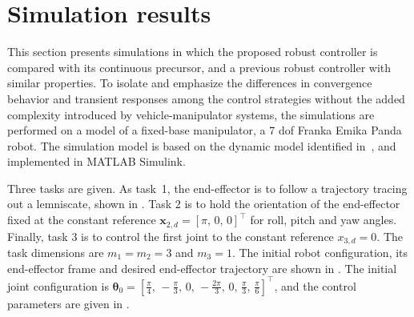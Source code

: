 \documentclass[../main.tex]{subfiles}
\begin{document}






\section{Simulation results}\label{sec:comp:simulation}
This section presents simulations in which the proposed robust controller is compared with its continuous precursor, and a previous robust controller with similar properties.
To isolate and emphasize the differences in convergence behavior and transient responses among the control strategies without the added complexity introduced by vehicle-manipulator systems, the simulations are performed on a model of a fixed-base manipulator, a 7 \gls{dof} Franka Emika Panda robot. The simulation model is based on the dynamic model identified in~\cite{Gaz2019}, and implemented in MATLAB Simulink.

Three tasks are given. As task~1, the end-effector is to follow a trajectory tracing out a lemniscate, shown in . Task 2 is to hold the orientation of the end-effector fixed at the constant reference $\bm{x}_{2,d} = [\pi,\, 0,\, 0]^\top$ for roll, pitch and yaw angles. Finally, task 3 is to control the first joint to the constant reference $x_{3,d} = 0$. The task dimensions are $m_1 = m_2 = 3$ and $m_3 = 1$. The initial robot configuration, its end-effector frame and desired end-effector trajectory are shown in . The initial joint configuration is ${\bm{\theta}_0 = \left[\frac{\pi}{4},\, -\frac{\pi}{3},\, 0,\, -\frac{2\pi}{3},\, 0,\, \frac{\pi}{3},\, \frac{\pi}{6}\right]^\top}$, and the control parameters are given in . %
\end{document}
